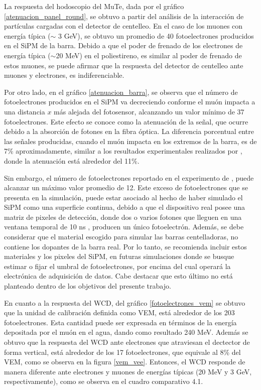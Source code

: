 \documentclass[12pt,oneside,openany,letter]{book}
\begin{document}
La respuesta del hodoscopio del MuTe, dada por el gr\'afico \ref{atenuacion_panel_round}, se obtuvo a partir del an\'alisis de la interacci\'on de part\'iculas cargadas con el detector de centelleo. En el caso de los muones con energ\'ia t\'ipica ($\sim$ 3 GeV), se obtuvo un promedio de 40 fotoelectrones producidos en el SiPM de la barra. Debido a que el poder de frenado de los electrones de energ\'ia t\'ipica ($\sim$20 MeV) en el poliestireno, es similar al poder de frenado de estos muones, se puede afirmar que la respuesta del detector de centelleo ante muones y electrones, es indiferenciable. 

Por otro lado, en el gr\'afico \ref{atenuacion_barra}, se observa que el n\'umero de fotoelectrones producidos en el SiPM va decreciendo conforme el mu\'on impacta a una distancia $x$ m\'as alejada del fotosensor, alcanzando un valor m\'inimo de 37 fotoelectrones. Este efecto se conoce como la atenuaci\'on de la se\~nal, que ocurre debido a la absorci\'on de fotones en la fibra \'optica. La diferencia porcentual entre las se\~nales producidas, cuando el mu\'on impacta en los extremos de la barra, es de 7\% aproximadamente, similar a los resultados experimentales realizados por \cite{CalderonArdila2018}, donde la atenuaci\'on est\'a alrededor del 11\%. 

Sin embargo, el n\'umero de fotoelectrones reportado en el experimento de \cite{CalderonArdila2018}, puede alcanzar un m\'aximo valor promedio de 12. Este exceso de fotoelectrones que se presenta en la simulaci\'on, puede estar asociado al hecho de haber simulado el SiPM como una superficie continua, debido a que el dispositivo real posee una matriz de pixeles de detecci\'on, donde dos o varios fotones que lleguen en una ventana temporal de 10 ns \cite{piatek2014measuring}, producen un \'unico fotoelectr\'on. Adem\'as, se debe considerar que el material escogido para simular las barras centelladoras, no contiene los dopantes de la barra real. Por lo tanto, se recomienda incluir estos materiales y los pixeles del SiPM, en futuras simulaciones donde se busque estimar o fijar el umbral de fotoelectrones, por encima del cual operar\'a la electr\'onica de adquisici\'on de datos. Cabe destacar que esto \'ultimo no est\'a planteado dentro de los objetivos del presente trabajo. 

En cuanto a la respuesta del WCD, del gr\'afico \ref{fotoelectrones_vem} se obtuvo que la unidad de calibraci\'on definida como VEM, est\'a alrededor de los 203 fotoelectrones. Esta cantidad puede ser expresada en t\'erminos de la energ\'ia depositada por el mu\'on en el agua, dando como resultado 240 MeV. Adem\'as se obtuvo que la respuesta del WCD ante electrones que atraviesan el dectector de forma vertical, est\'a alrededor de los 17 fotoelectrones, que equivale al 8\% del VEM, como se observa en la figura \ref{vem_vee}. Entonces, el WCD responde de manera diferente ante electrones y muones de energ\'ias t\'ipicas (20 MeV y 3 GeV, respectivamente), como se observa en el cuadro comparativo 4.1. %
\end{document}
